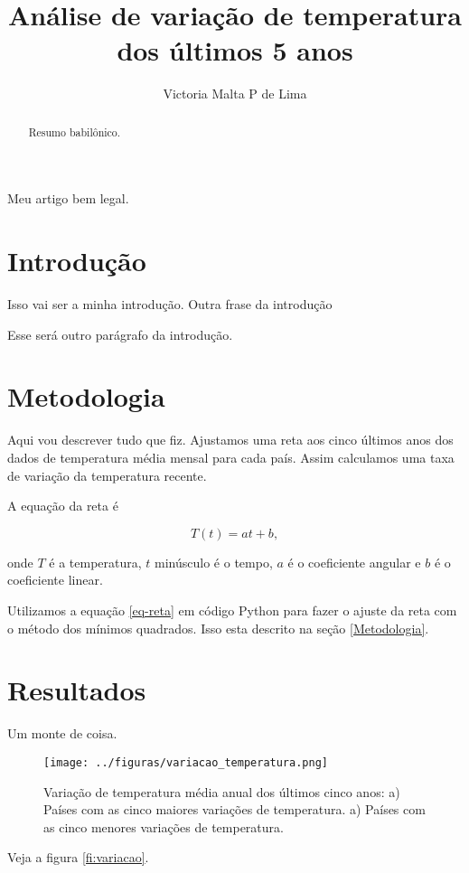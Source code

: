 \documentclass{article}
\begin{document}

\title{Análise de variação de temperatura dos últimos 5 anos}

\author{Victoria Malta P de Lima}

\maketitle

Meu artigo bem legal.

\begin{abstract}
Resumo babilônico.

\end{abstract}

\section{Introdução}

Isso vai ser a minha introdução.
Outra frase da introdução

Esse será outro parágrafo da introdução.

\section{Metodologia}

Aqui vou descrever tudo que fiz.
Ajustamos uma reta aos cinco últimos anos dos dados de temperatura média
mensal para cada país.
Assim calculamos uma taxa de variação da temperatura recente.

A equação da reta é

\begin{equation} 
T(t) = a t + b,
\label{eq-reta}
\end{equation}

\noindent %
onde $T$ é a temperatura, $t$ minúsculo é o tempo, $a$ é o coeficiente angular e $b$ é o coeficiente linear.

Utilizamos a equação \ref{eq-reta} em código Python para fazer o ajuste da 
reta com o método dos mínimos quadrados.
Isso esta descrito na seção \ref{Metodologia}.



\section{Resultados}

Um monte de coisa.

\begin{figure}[tb!] 
	\texttt{[image: ../figuras/variacao\_temperatura.png]}
	\caption{
	Variação de temperatura média anual dos últimos cinco anos:
	a) Países com as cinco maiores variações de temperatura.
	a) Países com as cinco menores variações de temperatura.
	}
	\label{fig:variacao}
\end{figure}

Veja a figura \ref{fi:variacao}.
\end{document}

